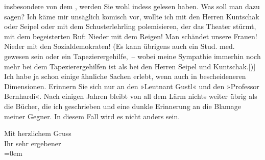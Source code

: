                insbesondere von dem \label{K_L02363-3v}\label{K_L02363-3}, werden Sie wohl indess gelesen haben. Was soll man dazu sagen? Ich käme mir
               unsäglich komisch vor, wollte ich mit den Herren Kuntschak oder Seipel oder mit dem
               Schusterlehrling polemisieren, der das Theater stürmt, mit dem begeisterten Ruf:
               Nieder mit dem Reigen! Man schändet unsere Frauen! Nieder mit den Sozialdemokraten!
               (Es kann übrigens auch ein Stud. med. gewesen sein oder ein Tapezierergehilfe, –
               wobei meine Sympathie immerhin noch mehr bei dem Tapezierergehilfen ist als bei den
               Herren Seipel und Kuntschak.{[}){]} Ich habe ja schon einige
               ähnliche Sachen erlebt, wenn auch in bescheideneren Dimensionen. Erinnern Sie sich
               nur an den »Leutnant Gustl« und den »Professor Bernhardi«. Nach einigen Jahren bleibt
               von all dem Lärm nichts weiter übrig als die Bücher, die ich geschrieben und eine
               dunkle Erinnerung an die Blamage meiner Gegner. In diesem Fall wird es nicht anders
               sein.\pend
           
\pstart
           Mit herzlichem Gruss{\\[\baselineskip]}Ihr sehr ergebener{\\[\baselineskip]}\pend
           \leftskip=0em{}\endnumbering{}  \newcommand{\dateiname}{L02363}\newcommand{\titel}{Arthur Schnitzler an Stefan Großmann, 17. 2. 1921}\newcommand{\editorInnen}{Martin Anton Müller und Gerd-Hermann Susen}
